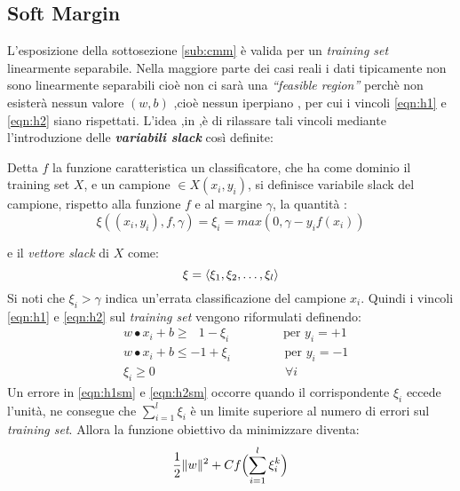 \subsection{Soft Margin}
L'esposizione della sottosezione \ref{sub:cmm} è valida per un \textit{training set} linearmente separabile. Nella maggiore parte dei casi reali i dati tipicamente non sono linearmente separabili cioè non ci sarà una \textit{``feasible region''} perchè non esisterà nessun valore $(w,b)$ ,cioè nessun iperpiano , per cui i vincoli \ref{eqn:h1} e \ref{eqn:h2} siano rispettati. L'idea ,in \cite{Cortes95},è di rilassare tali vincoli  mediante l'introduzione delle \textit{\textbf{variabili slack}} così definite:
\begin{definizione*}
Detta $f$ la funzione caratteristica un classificatore, che ha come dominio il training set $X$, e un campione $\in X (x_i , y_i)$, si definisce variabile slack del campione, rispetto alla funzione $f$ e al margine $\gamma$, la quantità :
\begin{equation*}
\xi((x_i , y_i) , f , \gamma  ) = \xi_{i} = max(0 , \gamma - y_if(x_i))
\end{equation*}
\end{definizione*}
e il \textit{vettore slack} di $X$ come:
\[ 
\xi = \Braket{\xi_1,\xi_2,\dots,\xi_l}
\] 
Si noti che $\xi_i > \gamma$ indica un'errata classificazione del campione $x_i$.
Quindi i vincoli \ref{eqn:h1} e \ref{eqn:h2} sul \textit{training set} vengono riformulati definendo:
\begin{align}
&w \bullet x_i + b \geq \:\:\:1-\xi_i \qquad \qquad\text{ per } y_i = +1 \label{eqn:h1sm}\\
&w \bullet x_i + b \leq -1+\xi_i \qquad \qquad\text{ per } y_i = -1  \label{eqn:h2sm}\\
&\xi_i \geq 0 \quad \qquad \qquad \qquad \qquad \quad\:\: \forall i \label{eqn:slack}
\end{align}
Un errore in \eqref{eqn:h1sm} e \eqref{eqn:h2sm} occorre quando il corrispondente $\xi_i$ eccede l'unità, ne consegue che $\sum_{i=1}^{l}\xi_i$ è un limite superiore al numero di errori sul \textit{training set}. Allora la funzione obiettivo da minimizzare diventa:
\begin{equation}
\label{eq:softorig}
\frac{1}{2}\lVert w\rVert^2 + Cf\Bigl(\sum_{i=1}^{l}\xi_i^k\Bigl)
\end{equation}
